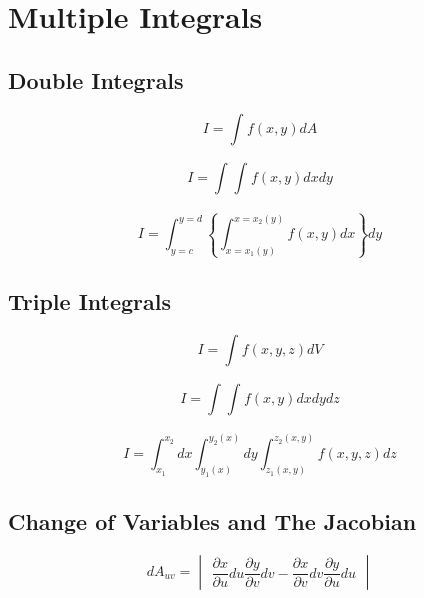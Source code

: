 \chapter{Multiple Integrals}

\section{Double Integrals}

\begin{equation*}
    I = \int_{}^{}f(x,y)dA
\end{equation*}

\begin{equation*}
    I = \int_{}^{}\int_{}^{}f(x,y)dxdy
\end{equation*}

\begin{equation*}
    I = \int_{y=c}^{y=d}\left\{
        \int_{x=x_1(y)}^{x=x_2(y)}
        f(x, y)dx
    \right\}dy
\end{equation*}

\section{Triple Integrals}

\begin{equation*}
    I = \int_{}^{}f(x,y,z)dV
\end{equation*}

\begin{equation*}
    I = \int_{}^{}\int_{}^{}f(x,y)dxdydz
\end{equation*}

\begin{equation*}
    I = \int_{x_1}^{x_2}dx
    \int_{y_1(x)}^{y_2(x)}dy
    \int_{z_1(x,y)}^{z_2(x,y)}f(x,y,z)dz
\end{equation*}

\section{Change of Variables and The Jacobian}

\begin{equation*}
    dA_{uv} = 
    \begin{vmatrix}
        \dfrac{\partial x}{\partial u}du
        \dfrac{\partial y}{\partial v}dv - 
        \dfrac{\partial x}{\partial v}dv
        \dfrac{\partial y}{\partial u}du
    \end{vmatrix}
\end{equation*}

